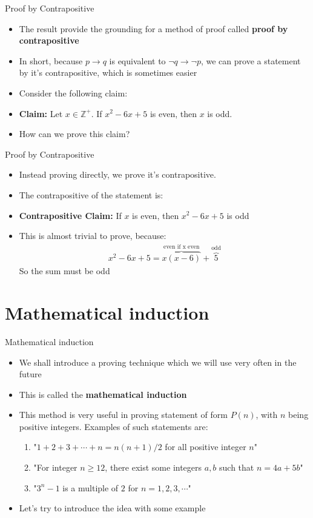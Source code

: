 \documentclass[10pt,xcolor={table,dvipsnames},t]{beamer}
\begin{document}
\begin{frame}{Proof by Contrapositive}
  \begin{itemize}
    \item The result provide the grounding for a method of proof called \textbf{proof by contrapositive}
    \item In short, because $p \rightarrow q$ is equivalent to $\neg q \rightarrow \neg p$, we can prove a statement by it's contrapositive, which is sometimes easier
    \item Consider the following claim:
    \item \textbf{Claim:}
      Let $x\in\mathbb{Z}^+$. If $x^2 -6x + 5$ is even, then $x$ is odd.
    \item How can we prove this claim?
  \end{itemize}
\end{frame}
\begin{frame}{Proof by Contrapositive}
  \begin{itemize}
    \item Instead proving directly, we prove it's contrapositive. 
    \item The contrapositive of the statement is:
    \item \textbf{Contrapositive Claim:} If $x$ is even, then $x^2 - 6x + 5$ is odd
    \item This is almost trivial to prove, because:
    \begin{align*}
      x^2 - 6x + 5 = \overbrace{x(x-6)}^{\text{even if x even}} + \overbrace{5}^{\text{odd}}
    \end{align*}
    So the sum must be odd
  \end{itemize}
\end{frame}


\section{Mathematical induction}
\begin{frame}{Mathematical induction}
  \begin{itemize}
    \item We shall introduce a proving technique which we will use very often in the future
    \item This is called the \textbf{mathematical induction}
    \item This method is very useful in proving statement of form $P(n)$, with $n$ being positive integers. Examples of such statements are:
    \begin{enumerate}
      \item "$1+2+3+\cdots + n = n(n+1)/2$ for all positive integer $n$"
      \item "For integer $n\geq 12$, there exist some integers $a,b$ such that $n=4a+5b$"
      \item "$3^n-1$ is a multiple of $2$ for $n=1,2,3,\cdots$"
    \end{enumerate}
    \item Let's try to introduce the idea with some example
  \end{itemize}
\end{frame}
\end{document}
